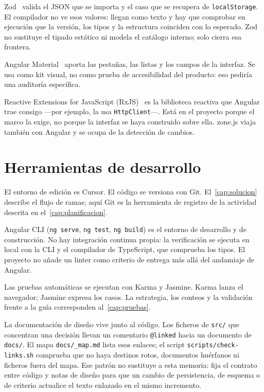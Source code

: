 Zod~\cite{zod} valida el JSON que se importa y el caso que se recupera
de \texttt{localStorage}. El compilador no ve esos valores: llegan como
texto y hay que comprobar en ejecución que la versión, los tipos y la
estructura coinciden con lo esperado. Zod no sustituye el tipado
estático ni modela el catálogo interno; solo cierra esa frontera.

Angular Material~\cite{material} aporta las pestañas, las listas y los
campos de la interfaz. Se usa como kit visual, no como prueba de
accesibilidad del producto: eso pediría una auditoría específica.

Reactive Extensions for JavaScript (RxJS)~\cite{rxjs} es la biblioteca
reactiva que Angular trae consigo ---por ejemplo, la usa
\texttt{HttpClient}---. Está en el proyecto porque el marco la exige,
no porque la interfaz se haya construido sobre ella. zone.js viaja
también con Angular y se ocupa de la detección de cambios.

\section{Herramientas de desarrollo}
\label{sec:herramientas}

El entorno de edición es Cursor. El código se versiona con Git.
El~\cref{cap:solucion} describe el flujo de ramas; aquí Git es la
herramienta de registro de la actividad descrita en
el~\cref{cap:planificacion}.

Angular CLI (\texttt{ng serve}, \texttt{ng test}, \texttt{ng build}) es el
entorno de desarrollo y de construcción. No hay integración continua propia:
la verificación se ejecuta en local con la CLI y el compilador de TypeScript,
que comprueba los tipos. El proyecto no añade un linter como criterio de
entrega más allá del andamiaje de Angular.

Las pruebas automáticas se ejecutan con Karma y Jasmine. Karma lanza el
navegador; Jasmine expresa los casos. La estrategia, los conteos y la
validación frente a la guía corresponden al~\cref{cap:pruebas}.

La documentación de diseño vive junto al código. Los ficheros de
\texttt{src/} que concentran una decisión llevan un comentario
\texttt{@linked} hacia un documento de \texttt{docs/}. El mapa
\texttt{docs/\_map.md} lista esos enlaces; el script
\texttt{scripts/check-links.sh} comprueba que no haya destinos rotos,
documentos huérfanos ni ficheros fuera del mapa. Ese patrón no sustituye
a esta memoria: fija el contrato entre código y notas de diseño para que
un cambio de persistencia, de esquema o de criterio actualice el texto
enlazado en el mismo incremento.

